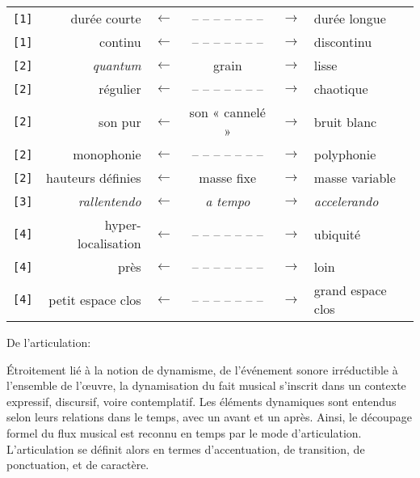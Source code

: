 \begin{longtable}{lrcccl}
\texttt{[1]} & durée courte & $\leftarrow$ & -- -- -- -- -- -- -- & $\rightarrow$ & durée longue \\
\texttt{[1]} & continu & $\leftarrow$ & -- -- -- -- -- -- -- & $\rightarrow$ & discontinu \\
\texttt{[2]} & \textit{quantum} & $\leftarrow$ & grain & $\rightarrow$ & lisse \\
\texttt{[2]} & régulier & $\leftarrow$ & -- -- -- -- -- -- -- & $\rightarrow$ & chaotique \\
\texttt{[2]} & son pur & $\leftarrow$ & son « cannelé » & $\rightarrow$ & bruit blanc \\
\texttt{[2]} & monophonie & $\leftarrow$ & -- -- -- -- -- -- -- & $\rightarrow$ & polyphonie \\
\texttt{[2]} & hauteurs définies & $\leftarrow$ & masse fixe & $\rightarrow$ & masse variable \\
\texttt{[3]} & \textit{rallentendo} & $\leftarrow$ & \textit{a tempo} & $\rightarrow$ & \textit{accelerando} \\
\texttt{[4]} & hyper-localisation & $\leftarrow$ & -- -- -- -- -- -- -- & $\rightarrow$ & ubiquité \\
\texttt{[4]} & près & $\leftarrow$ & -- -- -- -- -- -- -- & $\rightarrow$ & loin \\
\texttt{[4]} & petit espace clos & $\leftarrow$ & -- -- -- -- -- -- -- & $\rightarrow$ & grand espace clos \\
\end{longtable}



\bigskip

De l'articulation:

\smallskip

\noindent Étroitement lié à la notion de dynamisme, 
de l'événement sonore irréductible à l'ensemble de l'œuvre,
la dynamisation du fait musical
s'inscrit dans un contexte expressif, discursif, voire
 contemplatif. 
 Les éléments dynamiques sont entendus selon leurs relations dans le temps, avec un avant et un après.
Ainsi, le découpage formel du flux musical est reconnu en temps par le mode d’articulation.
L'articulation se définit alors en termes d'accentuation, de transition, de ponctuation, et de caractère.

